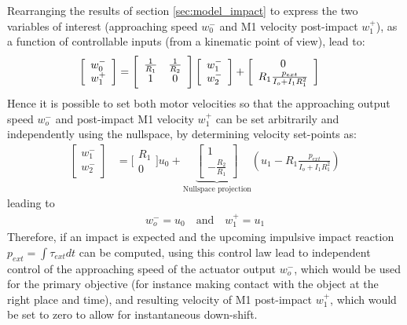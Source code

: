 Rearranging the results of section \ref{sec:model_impact} to express the two variables of interest (approaching speed $w_0^-$ and M1 velocity post-impact $w_1^+$), as a function of controllable inputs (from a kinematic point of view), lead to:
%
\begin{align}
\left[ \begin{array}{c} w_0^- \\ w_1^+ \end{array} \right] &= \Bigg[ \begin{array}{c c} \frac{1}{R_1} & \frac{1}{R_2}\\ 1 & 0 \end{array} \Bigg] \left[ \begin{array}{c} w_1^- \\ w_2^- \end{array} \right] + \left[ \begin{array}{c} 0 \\ R_1 \frac{  p_{ext}  }{I_o + I_1 R_1^2} \end{array} \right]
\label{eq:dsdm_impact_approx_sol}
\end{align}
%
Hence it is possible to set both motor velocities so that the approaching output speed $w_o^-$ and post-impact M1 velocity $w_1^+$ can be set arbitrarily and independently using the nullspace, by determining velocity set-points as:
%
\begin{align}
\left[ \begin{array}{c} w_1^- \\ w_2^- \end{array} \right] &= \Bigg[ \begin{array}{c} R_1 \\ 0  \end{array} \Bigg] u_0  + 
\underbrace{ \left[ \begin{array}{c} 1 \\ -\frac{R_2}{R_1} \end{array} \right]}_{\text{Nullspace projection}}
 \left( u_1 - R_1 \frac{ p_{ext} }{I_o + I_1 R_1^2} \right) 
\end{align}
%
leading to
%
\begin{align}
 w_o^- = u_0 \quad \text{and} \quad w_1^+ = u_1
\end{align}
%
Therefore, if an impact is expected and the upcoming impulsive impact reaction $p_{ext} = \int{\tau_{ext} dt}$ can be computed, using this control law lead to independent control of the approaching speed of the actuator output $w_o^-$, which would be used for the primary objective (for instance making contact with the object at the right place and time), and resulting velocity of M1 post-impact $w_1^+$, which would be set to zero to allow for instantaneous down-shift.

